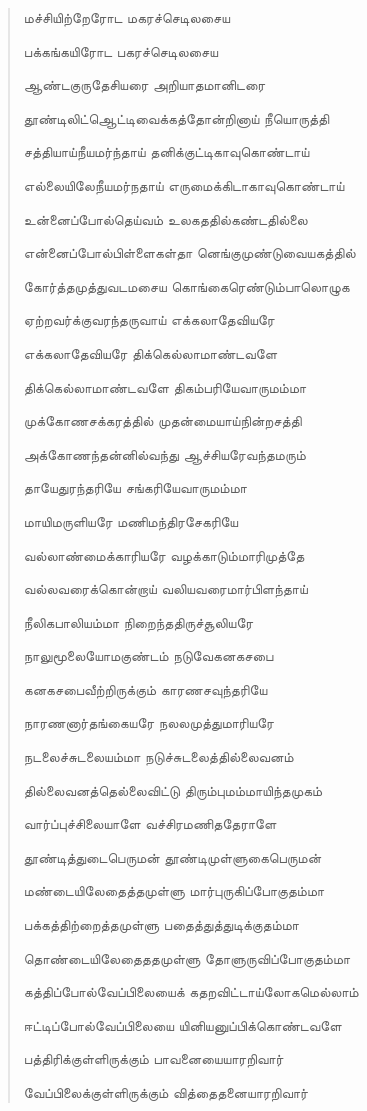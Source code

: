\documentclass{article}
\begin{document}
\begin{quotation}
{மச்சியிற்றேரோட மகரச்செடிலசைய

பக்கங்கயிரோட பகரச்செடிலசைய

ஆண்டகுருதேசியரை அறியாதமானிடரை

தூண்டிலிட்ஆெட்டிவைக்கத்தோன்றினாய் நீயொருத்தி

சத்தியாய்நீயமர்ந்தாய் தனிக்குட்டிகாவுகொண்டாய்

எல்லையிலேநீயமர்நதாய் எருமைக்கிடாகாவுகொண்டாய்

உன்னைப்போல்தெய்வம் உலகததில்கண்டதில்லை

என்னைப்போல்பிள்ளைகள்தா னெங்குமுண்டுவையகத்தில்

கோர்த்தமுத்துவடமசைய கொங்கைரெண்டும்பாலொழுக

ஏற்றவர்க்குவரந்தருவாய் எக்கலாதேவியரே

எக்கலாதேவியரே திக்கெல்லாமாண்டவளே

திக்கெல்லாமாண்டவளே திகம்பரியேவாருமம்மா

முக்கோணசக்கரத்தில் முதன்மையாய்நின்றசத்தி

அக்கோணந்தன்னில்வந்து ஆச்சியரேவந்தமரும்

தாயேதுரந்தரியே சங்கரியேவாருமம்மா

மாயிமருளியரே மணிமந்திரசேகரியே

வல்லாண்மைக்காரியரே வழக்காடும்மாரிமுத்தே

வல்லவரைக்கொன்றாய் வலியவரைமார்பிளந்தாய்

நீலிகபாலியம்மா நிறைந்ததிருச்சூலியரே

நாலுமூலையோமகுண்டம் நடுவேகனகசபை

கனகசபைவீற்றிருக்கும் காரணசவுந்தரியே

நாரணனார்தங்கையரே நலலமுத்துமாரியரே

நடலைச்சுடலையம்மா நடுச்சுடலைத்தில்லைவனம்

தில்லைவனத்தெல்லைவிட்டு திரும்புமம்மாயிந்தமுகம்

வார்ப்புச்சிலையாளே வச்சிரமணிததேராளே

தூண்டித்துடைபெருமன் தூண்டிமுள்ளுகைபெருமன்

மண்டையிலேதைத்தமுள்ளு மார்புருகிப்போகுதம்மா

பக்கத்திற்றைத்தமுள்ளு பதைத்துத்துடிக்குதம்மா

தொண்டையிலேதைததமுள்ளு தோளுருவிப்போகுதம்மா

கத்திப்போல்வேப்பிலையைக் கதறவிட்டாய்லோகமெல்லாம்

ஈட்டிப்போல்வேப்பிலையை யினியனுப்பிக்கொண்டவளே

பத்திரிக்குள்ளிருக்கும் பாவனையையாரறிவார்

வேப்பிலைக்குள்ளிருக்கும் வித்தைதனையாரறிவார்

}
\end{quotation}
\end{document}
